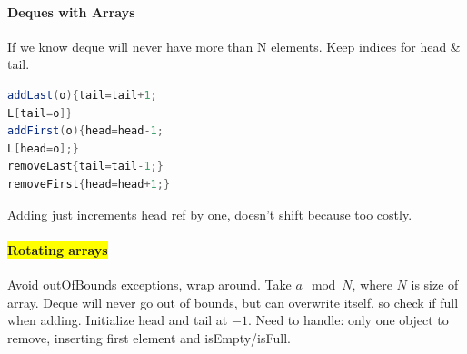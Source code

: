 \paragraph{Deques with Arrays}
If we know deque will never have more than N elements. Keep indices for head \& tail.
\begin{lstlisting}[language=java]
addLast(o){tail=tail+1;
L[tail=o]}
addFirst(o){head=head-1;
L[head=o];}
removeLast{tail=tail-1;}
removeFirst{head=head+1;}
\end{lstlisting}
Adding just increments head ref by one, doesn't shift because too costly.
\paragraph{\colorbox{Yellow}{Rotating arrays}}
Avoid outOfBounds exceptions, wrap around. Take $a \mod N$, where $N$ is size of array. Deque will never go out of bounds, but can overwrite itself, so check if full when adding. Initialize head and tail at $-1$. Need to handle: only one object to remove, inserting first element and isEmpty/isFull.
\color{Bittersweet}
